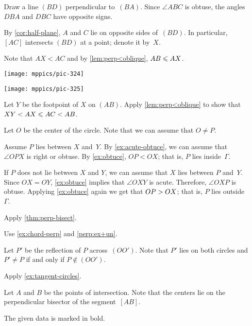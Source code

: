 \begin{multicols}{2}
Draw a line $(BD)$ perpendicular to~$(BA)$.
Since $\angle ABC$ is obtuse, 
the angles $DBA$ and $DBC$ have opposite signs.

By \ref{cor:half-plane},
$A$ and $C$ lie on opposite sides of~$(BD)$.
In particular, $[AC]$ intersects $(BD)$ at a point; denote it by~$X$.

Note that $AX<AC$ and by \ref{lem:perp<oblique}, $AB\z\le AX$.

\begin{Figure}
\vskip-0mm
\begin{minipage}{.49\textwidth}
\centering
\texttt{[image: mppics/pic-324]}
\end{minipage}
\hfill
\begin{minipage}{.49\textwidth}
\centering
\texttt{[image: mppics/pic-325]}
\end{minipage}
\end{Figure}

Let $Y$ be the footpoint of $X$ on $(AB)$.
Apply \ref{lem:perp<oblique} to show that 
$XY<AX\le AC\z<AB$.

Let $O$ be the center of the circle.
Note that we can assume that $O\ne P$.


Assume $P$ lies between $X$ and~$Y$.
By \ref{ex:acute-obtuce}, we can assume that $\angle OPX$ is right or obtuse.
By \ref{ex:obtuce}, $OP<OX$; 
that is, $P$ lies inside~$\Gamma$.

If $P$ does not lie between $X$ and $Y$, we can assume that $X$ lies between $P$ and~$Y$.
Since $OX=OY$, \ref{ex:obtuce} implies that $\angle OXY$ is acute.
Therefore, $\angle OXP$ is obtuse.
Applying \ref{ex:obtuce} again we get that $OP\z>OX$;
that is, $P$ lies outside~$\Gamma$.

 Apply \ref{thm:perp-bisect}.

 Use \ref{ex:chord-perp} and \ref{perp:ex+un}.

Let $P'$ be the reflection of $P$ across~$(OO')$.
Note that $P'$ lies on both circles and $P'\ne P$ if and only if $P\notin(OO')$.

  Apply \ref{ex:tangent-circles}.

Let $A$ and $B$ be the points of intersection.
Note that the centers lie on the perpendicular bisector of the segment~$[AB]$.

The given data is marked in bold.


\end{multicols}
